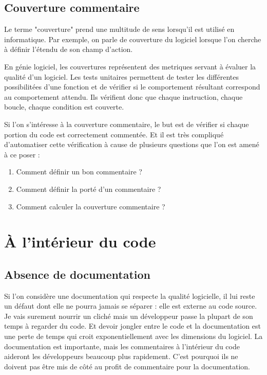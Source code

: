 \documentclass[10pt,a4paper,twoside, openany]{report}
\begin{document}
\section{Couverture commentaire}

Le terme "couverture" prend une multitude de sens lorsqu'il est utilis\'e en informatique. Par exemple, on parle de couverture du logiciel lorsque l'on cherche \`a d\'efinir l'\'etendu de son champ d'action.

En g\'enie logiciel, les couvertures repr\'esentent des metriques servant \`a \'evaluer la qualit\'e d'un logiciel. Les tests unitaires permettent de tester les diff\'erentes possibilit\'ees d'une fonction et de v\'erifier si le comportement r\'esultant correspond au comportement attendu. Ils v\'erifient donc que chaque instruction, chaque boucle, chaque condition est couverte.

Si l'on s'int\'eresse \`a la couverture commentaire, le but est de v\'erifier si chaque portion du code est correctement comment\'ee. Et il est tr\`es compliqu\'e d'automatiser cette v\'erification \`a cause de plusieurs questions que l'on est amen\'e \`a ce poser :

\begin{enumerate}
\item{Comment d\'efinir un bon commentaire ?}
\item{Comment d\'efinir la port\'e d'un commentaire ?}
\item{Comment calculer la couverture commentaire ?}
\end{enumerate}

\chapter{\`A l'int\'erieur du code}

\section{Absence de documentation}

Si l'on consid\`ere une documentation qui respecte la qualit\'e logicielle, il lui reste un d\'efaut dont elle ne pourra jamais se s\'eparer : elle est externe au code source. Je vais surement nourrir un clich\'e mais un d\'eveloppeur passe la plupart de son temps \`a regarder du code. Et devoir jongler entre le code et la documentation est une perte de temps qui croit exponentiellement avec les dimensions du logiciel. La documentation est importante, mais les commentaires \`a l'int\'erieur du code aideront les d\'eveloppeurs beaucoup plus rapidement. C'est pourquoi ils ne doivent pas \^etre mis de c\^ot\'e au profit de commentaire pour la documentation.\newline
\end{document}
